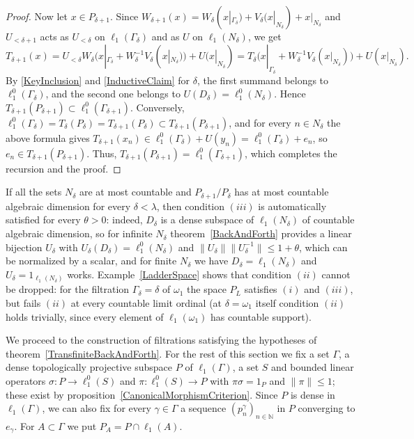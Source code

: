 \documentclass[12pt]{article}
\newcommand{\lo}[1]{\ell_1^0(#1)}
\newcommand{\ellone}[1]{\ell_1(#1)}
\newcommand{\norm}[1]{\lVert #1\rVert}
\begin{document}
\begin{proof}
    Now let $x\in P_{\delta+1}$. Since $W_{\delta+1}(x)=W_\delta(x|_{\Gamma_\delta})
    +V_\delta(x|_{N_\delta})+x|_{N_\delta}$ and $U_{<\delta+1}$ acts as
    $U_{<\delta}$ on $\ellone{\Gamma_\delta}$ and as $U$ on
    $\ellone{N_\delta}$, we get
    \[
    T_{\delta+1}(x)=U_{<\delta}W_\delta\bigl(x|_{\Gamma_\delta}+W_\delta^{-1}V_\delta(x|_{N_\delta})\bigr)
    +U(x|_{N_\delta})
    =T_\delta\bigl(x|_{\Gamma_\delta}+W_\delta^{-1}V_\delta(x|_{N_\delta})\bigr)
    +U(x|_{N_\delta}).
    \]
    By \eqref{KeyInclusion} and \eqref{InductiveClaim} for $\delta$, the
    first summand belongs to $\lo{\Gamma_\delta}$, and the second one belongs
    to $U(D_\delta)=\lo{N_\delta}$. Hence $T_{\delta+1}(P_{\delta+1})\subset\lo{\Gamma_{\delta+1}}$.
    Conversely, $\lo{\Gamma_\delta}=T_\delta(P_\delta)=T_{\delta+1}(P_\delta)
    \subset T_{\delta+1}(P_{\delta+1})$, and for every $n\in N_\delta$ the
    above formula gives $T_{\delta+1}(x_n)\in\lo{\Gamma_\delta}+U(y_n)
    =\lo{\Gamma_\delta}+e_n$, so $e_n\in T_{\delta+1}(P_{\delta+1})$. Thus,
    $T_{\delta+1}(P_{\delta+1})=\lo{\Gamma_{\delta+1}}$, which completes the
    recursion and the proof.
\end{proof}

If all the sets $N_\delta$ are at most countable and $P_{\delta+1}/P_\delta$
has at most countable algebraic dimension for every $\delta<\lambda$, then
condition $(iii)$ is automatically satisfied for every $\theta>0$: indeed,
$D_\delta$ is a dense subspace of $\ellone{N_\delta}$ of countable algebraic
dimension, so for infinite $N_\delta$ theorem~\ref{BackAndForth} provides a
linear bijection $U_\delta$ with $U_\delta(D_\delta)=\lo{N_\delta}$ and
$\norm{U_\delta}\norm{U_\delta^{-1}}\leq 1+\theta$, which can be normalized by
a scalar, and for finite $N_\delta$ we have $D_\delta=\ellone{N_\delta}$ and
$U_\delta=1_{\ellone{N_\delta}}$ works. Example~\ref{LadderSpace} shows that
condition $(ii)$ cannot be dropped: for the filtration $\Gamma_\delta=\delta$
of $\omega_1$ the space $P_L$ satisfies $(i)$ and $(iii)$, but fails $(ii)$
at every countable limit ordinal (at $\delta=\omega_1$ itself condition
$(ii)$ holds trivially, since every element of $\ellone{\omega_1}$ has
countable support).

We proceed to the construction of filtrations satisfying the hypotheses of
theorem~\ref{TransfiniteBackAndForth}. For the rest of this section we fix a
set $\Gamma$, a dense topologically
projective subspace $P$ of $\ellone{\Gamma}$, a set $S$ and bounded linear
operators $\sigma:P\to\lo{S}$ and $\pi:\lo{S}\to P$ with $\pi\sigma=1_P$ and
$\norm{\pi}\leq 1$; these exist by proposition~\ref{CanonicalMorphismCriterion}.
Since $P$ is dense in $\ellone{\Gamma}$, we can also fix for every
$\gamma\in\Gamma$ a sequence ${(p^\gamma_n)}_{n\in\mathbb{N}}$ in $P$ converging
to $e_\gamma$. For $A\subset\Gamma$ we put $P_A=P\cap\ellone{A}$.
\end{document}
